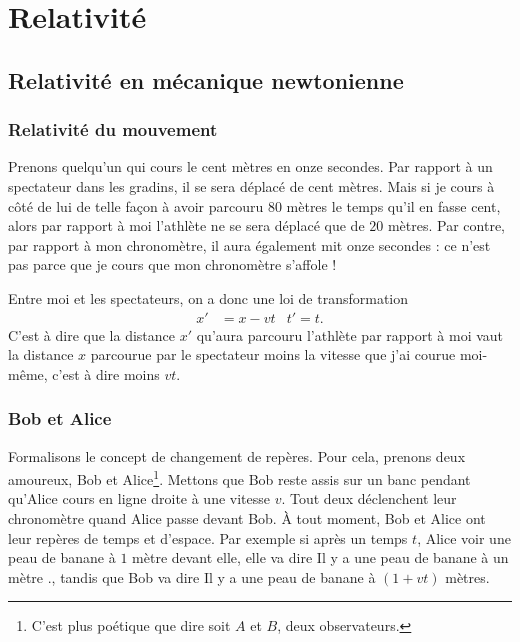\documentclass[a4paper,12pt]{book}
\theoremstyle{mes_exemples}	\newtheorem{exemple}[numtho]{Exemple}
\theoremstyle{mes_tho}
\begin{document}
\chapter{Relativité}
	
\section{Relativité en mécanique newtonienne}

\subsection{Relativité du mouvement}

Prenons quelqu'un qui cours le cent mètres en onze secondes. Par rapport à un spectateur dans les gradins, il se sera déplacé de cent mètres. Mais si je cours à côté de lui de telle façon à avoir parcouru $80$ mètres le temps qu'il en fasse cent, alors par rapport à moi l'athlète ne se sera déplacé que de $20$ mètres. Par contre, par rapport à mon chronomètre, il aura également mit onze secondes : ce n'est pas parce que je cours que mon chronomètre s'affole !

Entre moi et les spectateurs, on a donc une loi de transformation
\begin{align}		\label{EqTransGal}
x'&=x-vt&	t'=t.
\end{align}
C'est à dire que la distance $x'$ qu'aura parcouru l'athlète par rapport à moi vaut la distance $x$ parcourue par le spectateur moins la vitesse que j'ai courue moi-même, c'est à dire moins $vt$.

\subsection{Bob et Alice}

Formalisons le concept de changement de repères. Pour cela, prenons deux amoureux, Bob et Alice\footnote{C'est plus poétique que dire \og soit $A$ et $B$, deux observateurs\fg{}.}. Mettons que Bob reste assis sur un banc pendant qu'Alice cours en ligne droite à une vitesse $v$. Tout deux déclenchent leur chronomètre quand Alice passe devant Bob. À tout moment, Bob et Alice ont leur repères de temps et d'espace. Par exemple si après un temps $t$, Alice voir une peau de banane à $1$ mètre devant elle, elle va dire \og Il y a une peau de banane à un mètre .\fg{}, tandis que Bob va dire \og Il y a une peau de banane à $(1+vt)$ mètres\fg.
\end{document}
